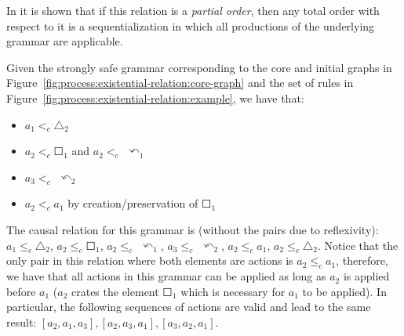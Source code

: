 In \cite{Corradini1996} it is shown that if this relation is a \emph{partial order}, then any total order with respect to it is a sequentialization in which all productions of the underlying grammar are applicable.

\begin{example}\label{ex:process:existential-relation} Given the strongly safe grammar corresponding to the core and initial graphs in Figure~\ref{fig:process:existential-relation:core-graph} and the set of rules in Figure~\ref{fig:process:existential-relation:example}, we have that:

\begin{itemize}
  \item $a_1 <_c \triangle_2$
  \item $a_2 <_c \Square_1$ and $a_2 <_c$ $\curvearrowleft_1$
  \item $a_3 <_c$ $\curvearrowleft_2$
  \item $a_2 <_c a_1$ by creation/preservation of $\Square_1$
\end{itemize}

  The causal relation for this grammar is (without the pairs due to reflexivity): $a_1 \leq_c \triangle_2$, $a_2 \leq_c \Square_1$, $a_2 \leq_c$ $\curvearrowleft_1$, $a_3 \leq_c$ $\curvearrowleft_2$, $a_2 \leq_c a_1$, $a_2 \leq_c \triangle_2$. Notice that the only pair in this relation where both elements are actions is \mbox{$a_2 \leq_c a_1$}, therefore, we have that all actions in this grammar can be applied as long as $a_2$ is applied before $a_1$ ($a_2$ crates the element $\Square_1$
  which is necessary for $a_1$ to be applied). In particular, the following sequences of actions are valid and lead to the same result: $[a_2,a_1,a_3],[a_2,a_3,a_1],[a_3,a_2,a_1]$.


\end{example}
